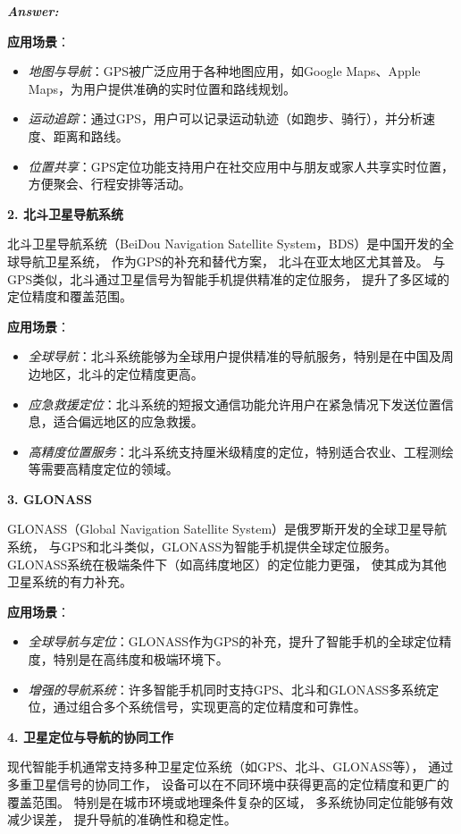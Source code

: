 \documentclass[12pt]{article}
\newenvironment{Answer}{
  \vspace{12pt}
  {\large\textbf{\textit{\hspace{-12pt}Answer:}}}\par
  \vspace{8pt}
} {\vspace{24pt}}
\begin{document}
\begin{Answer}
\textbf{应用场景}：
\begin{itemize}
    \item \textit{地图与导航}：GPS被广泛应用于各种地图应用，如Google Maps、Apple Maps，为用户提供准确的实时位置和路线规划。
    \item \textit{运动追踪}：通过GPS，用户可以记录运动轨迹（如跑步、骑行），并分析速度、距离和路线。
    \item \textit{位置共享}：GPS定位功能支持用户在社交应用中与朋友或家人共享实时位置，方便聚会、行程安排等活动。
\end{itemize}

\noindent\textbf{2. 北斗卫星导航系统}\noindent

北斗卫星导航系统（BeiDou Navigation Satellite System，BDS）是中国开发的全球导航卫星系统，
作为GPS的补充和替代方案，
北斗在亚太地区尤其普及。
与GPS类似，北斗通过卫星信号为智能手机提供精准的定位服务，
提升了多区域的定位精度和覆盖范围。

\textbf{应用场景}：
\begin{itemize}
    \item \textit{全球导航}：北斗系统能够为全球用户提供精准的导航服务，特别是在中国及周边地区，北斗的定位精度更高。
    \item \textit{应急救援定位}：北斗系统的短报文通信功能允许用户在紧急情况下发送位置信息，适合偏远地区的应急救援。
    \item \textit{高精度位置服务}：北斗系统支持厘米级精度的定位，特别适合农业、工程测绘等需要高精度定位的领域。
\end{itemize}

\noindent\textbf{3. GLONASS}\noindent

GLONASS（Global Navigation Satellite System）是俄罗斯开发的全球卫星导航系统，
与GPS和北斗类似，GLONASS为智能手机提供全球定位服务。
GLONASS系统在极端条件下（如高纬度地区）的定位能力更强，
使其成为其他卫星系统的有力补充。

\textbf{应用场景}：
\begin{itemize}
    \item \textit{全球导航与定位}：GLONASS作为GPS的补充，提升了智能手机的全球定位精度，特别是在高纬度和极端环境下。
    \item \textit{增强的导航系统}：许多智能手机同时支持GPS、北斗和GLONASS多系统定位，通过组合多个系统信号，实现更高的定位精度和可靠性。
\end{itemize}

\noindent\textbf{4. 卫星定位与导航的协同工作}\noindent

现代智能手机通常支持多种卫星定位系统（如GPS、北斗、GLONASS等），
通过多重卫星信号的协同工作，
设备可以在不同环境中获得更高的定位精度和更广的覆盖范围。
特别是在城市环境或地理条件复杂的区域，
多系统协同定位能够有效减少误差，
提升导航的准确性和稳定性。


\end{Answer}
\end{document}
